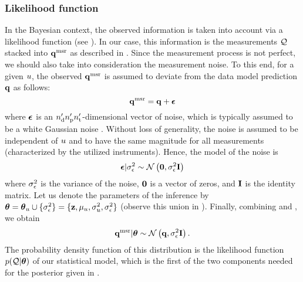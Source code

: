 \subsubsection{Likelihood function}
In the Bayesian context, the observed information is taken into account via a likelihood function (see ).
In our case, this information is the measurements $\mathcal{Q}$ stacked into $\mathbf{q}^{\text{msr}}$ as described in .
Since the measurement process is not perfect, we should also take into consideration the measurement noise.
To this end, for a given $u$, the observed $\mathbf{q}^{\text{msr}}$ is assumed to deviate from the data model prediction $\mathbf{q}$ as follows:
\begin{equation} \elabel{noisy-measurements}
  \vq^\meas = \vq + \vnoise
\end{equation}
where $\boldsymbol\epsilon$ is an ${n_\text{d}'} {n_\text{p}'} {n_\text{t}'}$-dimensional vector of noise, which is typically assumed to be a white Gaussian noise \cite{rasmussen2006, marzouk2009}.
Without loss of generality, the noise is assumed to be independent of $u$ and to have the same magnitude for all measurements (characterized by the utilized instruments).
Hence, the model of the noise is
\begin{equation} \elabel{noise-model}
  \vnoise | \sigma^2_\noise \sim \gaussian{\vZero}{\sigma^2_\noise \mOne}
\end{equation}
where $\sigma^2_\epsilon$ is the variance of the noise, $\mathbf{0}$ is a vector of zeros, and $\mathbf{I}$ is the identity matrix.
Let us denote the parameters of the inference by ${\boldsymbol\theta} = {\boldsymbol\theta}_u \cup \{ \sigma_\epsilon^2 \} = \{ \mathbf{z}, \mu_u, \sigma_u^2, \sigma_\epsilon^2 \}$ (observe this union in ).
Finally, combining  and , we obtain
\begin{equation} \elabel{likelihood}
  \vq^\meas | \vparam \sim \gaussian{\vq}{\sigma_\noise^2 \mOne}.
\end{equation}
The probability density function of this distribution is the likelihood function $\f{\QData | \vparam}$ of our statistical model, which is the first of the two components needed for the posterior given in .

